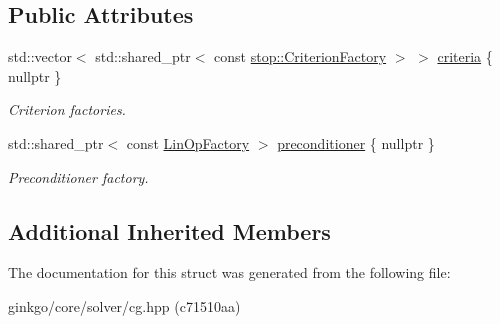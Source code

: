 \subsection*{Public Attributes}
\begin{DoxyCompactItemize}
\item 
\mbox{\label{structgko_1_1solver_1_1Cg_1_1parameters__type_af8544e18d6657180b3a13a98c79e4fa8}} 
std\+::vector$<$ std\+::shared\+\_\+ptr$<$ const \hyperlink{namespacegko_1_1stop_ab12a51109c50b35ec36dc5a393d6a9a0}{stop\+::\+Criterion\+Factory} $>$ $>$ \hyperlink{structgko_1_1solver_1_1Cg_1_1parameters__type_af8544e18d6657180b3a13a98c79e4fa8}{criteria} \{ nullptr \}
\begin{DoxyCompactList}\small\item\em Criterion factories. \end{DoxyCompactList}\item 
\mbox{\label{structgko_1_1solver_1_1Cg_1_1parameters__type_ab319c47fc1c31ad73d58c6aac4fdea6f}} 
std\+::shared\+\_\+ptr$<$ const \hyperlink{classgko_1_1LinOpFactory}{Lin\+Op\+Factory} $>$ \hyperlink{structgko_1_1solver_1_1Cg_1_1parameters__type_ab319c47fc1c31ad73d58c6aac4fdea6f}{preconditioner} \{ nullptr \}
\begin{DoxyCompactList}\small\item\em Preconditioner factory. \end{DoxyCompactList}\end{DoxyCompactItemize}
\subsection*{Additional Inherited Members}


The documentation for this struct was generated from the following file\+:\begin{DoxyCompactItemize}
\item 
ginkgo/core/solver/cg.\+hpp (c71510aa)\end{DoxyCompactItemize}
